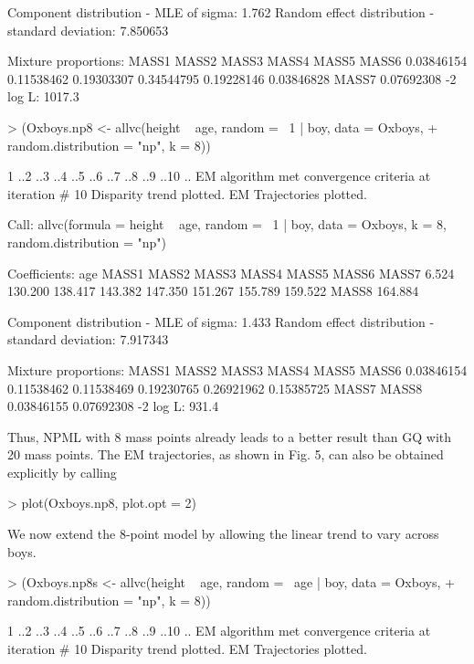 \documentclass[a4paper]{article}
\begin{document}
\begin{landscape}
\begin{Schunk}
\begin{Soutput}
Component distribution - MLE of sigma:	   1.762 
Random effect distribution - standard deviation:	   7.850653 

Mixture proportions:
     MASS1       MASS2       MASS3       MASS4       MASS5       MASS6  
0.03846154  0.11538462  0.19303307  0.34544795  0.19228146  0.03846828  
     MASS7  
0.07692308  
-2 log L:	    1017.3 
\end{Soutput}
\begin{Sinput}
> (Oxboys.np8 <- allvc(height ~ age, random = ~1 | boy, data = Oxboys, 
+     random.distribution = "np", k = 8))
\end{Sinput}
\begin{Soutput}
1 ..2 ..3 ..4 ..5 ..6 ..7 ..8 ..9 ..10 ..
EM algorithm met convergence criteria at iteration #  10 
Disparity trend plotted.
EM Trajectories plotted.

Call:  allvc(formula = height ~ age, random = ~1 | boy, data = Oxboys,      k = 8, random.distribution = "np") 

Coefficients:
    age    MASS1    MASS2    MASS3    MASS4    MASS5    MASS6    MASS7  
  6.524  130.200  138.417  143.382  147.350  151.267  155.789  159.522  
  MASS8  
164.884  

Component distribution - MLE of sigma:	   1.433 
Random effect distribution - standard deviation:	   7.917343 

Mixture proportions:
     MASS1       MASS2       MASS3       MASS4       MASS5       MASS6  
0.03846154  0.11538462  0.11538469  0.19230765  0.26921962  0.15385725  
     MASS7       MASS8  
0.03846155  0.07692308  
-2 log L:	    931.4 
\end{Soutput}
\end{Schunk}
 Thus, NPML with 8 mass points already leads to a better result than GQ with 20 mass points. 
 The EM trajectories, as shown in Fig. 5, can also be
 obtained explicitly by calling
 
 
\begin{Schunk}
\begin{Sinput}
> plot(Oxboys.np8, plot.opt = 2)
\end{Sinput}
\end{Schunk}
 
  
 We now extend the 8-point model by allowing the linear trend to vary across boys.
\begin{Schunk}
\begin{Sinput}
> (Oxboys.np8s <- allvc(height ~ age, random = ~age | boy, data = Oxboys, 
+     random.distribution = "np", k = 8))
\end{Sinput}
\begin{Soutput}
1 ..2 ..3 ..4 ..5 ..6 ..7 ..8 ..9 ..10 ..
EM algorithm met convergence criteria at iteration #  10 
Disparity trend plotted.
EM Trajectories plotted.


\end{Soutput}
\end{Schunk}
\end{landscape}
\end{document}
